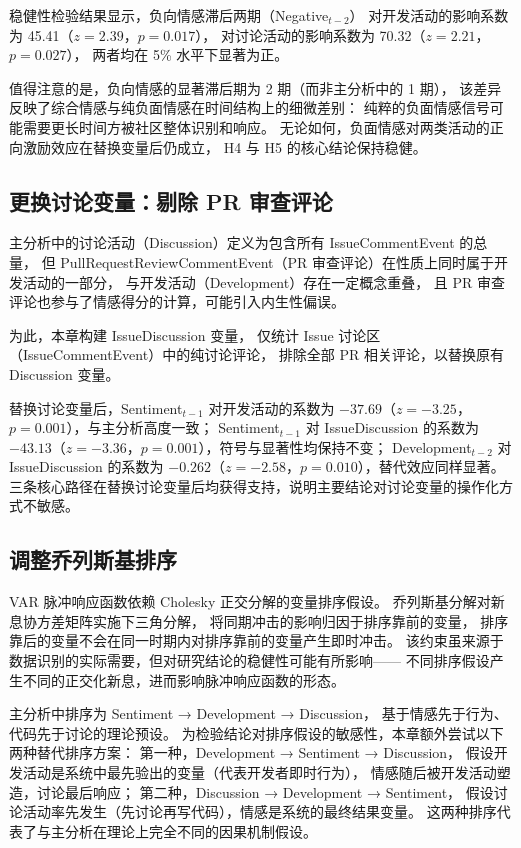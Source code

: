 \documentclass[
    type = master, %
    degree = professional,        %
    decl-page,  %
    twoside,                %
    fontset = fandol %
  ]{njuthesis}
\begin{document}
稳健性检验结果显示，负向情感滞后两期（Negative$_{t-2}$）
对开发活动的影响系数为 45.41（$z = 2.39$，$p = 0.017$），
对讨论活动的影响系数为 70.32（$z = 2.21$，$p = 0.027$），
两者均在 5\% 水平下显著为正。

值得注意的是，负向情感的显著滞后期为 2 期（而非主分析中的 1 期），
该差异反映了综合情感与纯负面情感在时间结构上的细微差别：
纯粹的负面情感信号可能需要更长时间方被社区整体识别和响应。
无论如何，负面情感对两类活动的正向激励效应在替换变量后仍成立，
H4 与 H5 的核心结论保持稳健。

\subsection{更换讨论变量：剔除 PR 审查评论}

主分析中的讨论活动（Discussion）定义为包含所有 IssueCommentEvent 的总量，
但 PullRequestReviewCommentEvent（PR 审查评论）在性质上同时属于开发活动的一部分，
与开发活动（Development）存在一定概念重叠，
且 PR 审查评论也参与了情感得分的计算，可能引入内生性偏误。

为此，本章构建 IssueDiscussion 变量，
仅统计 Issue 讨论区（IssueCommentEvent）中的纯讨论评论，
排除全部 PR 相关评论，以替换原有 Discussion 变量。

替换讨论变量后，Sentiment$_{t-1}$ 对开发活动的系数为
$-37.69$（$z = -3.25$，$p = 0.001$），与主分析高度一致；
Sentiment$_{t-1}$ 对 IssueDiscussion 的系数为
$-43.13$（$z = -3.36$，$p = 0.001$），符号与显著性均保持不变；
Development$_{t-2}$ 对 IssueDiscussion 的系数为
$-0.262$（$z = -2.58$，$p = 0.010$），替代效应同样显著。
三条核心路径在替换讨论变量后均获得支持，说明主要结论对讨论变量的操作化方式不敏感。

\subsection{调整乔列斯基排序}

VAR 脉冲响应函数依赖 Cholesky 正交分解的变量排序假设。
乔列斯基分解对新息协方差矩阵实施下三角分解，
将同期冲击的影响归因于排序靠前的变量，
排序靠后的变量不会在同一时期内对排序靠前的变量产生即时冲击。
该约束虽来源于数据识别的实际需要，但对研究结论的稳健性可能有所影响——
不同排序假设产生不同的正交化新息，进而影响脉冲响应函数的形态。

主分析中排序为 Sentiment → Development → Discussion，
基于情感先于行为、代码先于讨论的理论预设。
为检验结论对排序假设的敏感性，本章额外尝试以下两种替代排序方案：
第一种，Development → Sentiment → Discussion，
假设开发活动是系统中最先验出的变量（代表开发者即时行为），
情感随后被开发活动塑造，讨论最后响应；
第二种，Discussion → Development → Sentiment，
假设讨论活动率先发生（先讨论再写代码），情感是系统的最终结果变量。
这两种排序代表了与主分析在理论上完全不同的因果机制假设。
\end{document}
